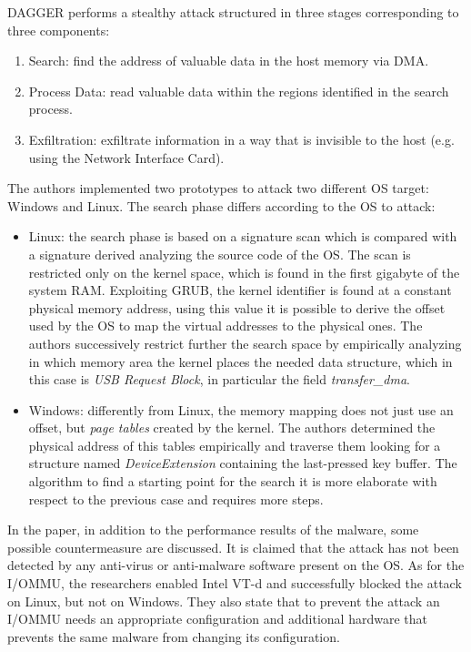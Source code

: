 DAGGER performs a stealthy attack structured in three stages corresponding to three components:
\begin{enumerate}
    \item Search: find the address of valuable data in the host memory via DMA.
    \item Process Data: read valuable data within the regions identified in the search process.
    \item Exfiltration: exfiltrate information in a way that is invisible to the host (e.g. using the Network Interface Card). 
\end{enumerate}

The authors implemented two prototypes to attack two different OS target: Windows and Linux. The search phase differs according to the OS to attack:
\begin{itemize}
    \item Linux: the search phase is based on a signature scan which is compared with a signature derived analyzing the source code of the OS. The scan is restricted only on the kernel space, which is found in the first gigabyte of the system RAM. Exploiting GRUB, the kernel identifier is found at a constant physical memory address, using this value it is possible to derive the offset used by the OS to map the virtual addresses to the physical ones. The authors successively restrict further the search space by empirically analyzing in which memory area the kernel places the needed data structure, which in this case is \emph{USB Request Block}, in particular the field \emph{transfer\_dma}.
    \item Windows: differently from Linux, the memory mapping does not just use an offset, but \emph{page tables} created by the kernel. The authors determined the physical address of this tables empirically and traverse them looking for a structure named \emph{DeviceExtension} containing the last-pressed key buffer. The algorithm to find a starting point for the search it is more elaborate with respect to the previous case and requires more steps. %
\end{itemize}

In the paper, in addition to the performance results of the malware, some possible countermeasure are discussed. It is claimed that the attack has not been detected by any anti-virus or anti-malware software present on the OS. As for the I/OMMU, the researchers enabled Intel VT-d and successfully blocked the attack on Linux, but not on Windows. They also state that to prevent the attack an I/OMMU needs an appropriate configuration and additional hardware that prevents the same malware from changing its configuration.



